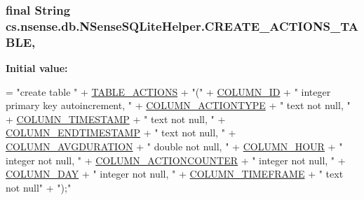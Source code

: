 \hypertarget{classcs_1_1nsense_1_1db_1_1_n_sense_s_q_lite_helper_aedf992886bbf3b5842f6417426c7d37e}{
\subsubsection[{C\-R\-E\-A\-T\-E\-\_\-\-A\-C\-T\-I\-O\-N\-S\-\_\-\-T\-A\-B\-L\-E}]{\setlength{\rightskip}{0pt plus 5cm}final String cs.\-nsense.\-db.\-N\-Sense\-S\-Q\-Lite\-Helper.\-C\-R\-E\-A\-T\-E\-\_\-\-A\-C\-T\-I\-O\-N\-S\-\_\-\-T\-A\-B\-L\-E\hspace{0.3cm}{\ttfamily [static]}, {\ttfamily [private]}}}\label{classcs_1_1nsense_1_1db_1_1_n_sense_s_q_lite_helper_aedf992886bbf3b5842f6417426c7d37e}
{\bfseries Initial value\-:}
\begin{DoxyCode}
= \textcolor{stringliteral}{"create table "}
            + \hyperlink{classcs_1_1nsense_1_1db_1_1_n_sense_s_q_lite_helper_a5f659e28731b09d4ca291943321aa63d}{TABLE\_ACTIONS} + \textcolor{stringliteral}{"("}
            + \hyperlink{classcs_1_1nsense_1_1db_1_1_n_sense_s_q_lite_helper_a42c92e67b4392524cb4f6bf4c4da4c79}{COLUMN\_ID} + \textcolor{stringliteral}{" integer primary key autoincrement, "}
            + \hyperlink{classcs_1_1nsense_1_1db_1_1_n_sense_s_q_lite_helper_a4c4a857f8054a2172b2a7f2857787c20}{COLUMN\_ACTIONTYPE} + \textcolor{stringliteral}{" text not null, "}
            + \hyperlink{classcs_1_1nsense_1_1db_1_1_n_sense_s_q_lite_helper_a37a51662ad91359cdc1218f20e1de3b1}{COLUMN\_TIMESTAMP} + \textcolor{stringliteral}{" text not null, "}
            + \hyperlink{classcs_1_1nsense_1_1db_1_1_n_sense_s_q_lite_helper_a68730f905d374511aa5caf74f9ee728e}{COLUMN\_ENDTIMESTAMP} + \textcolor{stringliteral}{" text not null, "}
            + \hyperlink{classcs_1_1nsense_1_1db_1_1_n_sense_s_q_lite_helper_a00ad71140d9af9a9f820992793244221}{COLUMN\_AVGDURATION} + \textcolor{stringliteral}{" double not null, "}
            + \hyperlink{classcs_1_1nsense_1_1db_1_1_n_sense_s_q_lite_helper_a9e10735627e7603a3fba1e9fa908efa6}{COLUMN\_HOUR} + \textcolor{stringliteral}{" integer not null, "}
            + \hyperlink{classcs_1_1nsense_1_1db_1_1_n_sense_s_q_lite_helper_a0a8906d703a22bdcad7fe68cff136c2c}{COLUMN\_ACTIONCOUNTER} + \textcolor{stringliteral}{" integer not null, "}
            + \hyperlink{classcs_1_1nsense_1_1db_1_1_n_sense_s_q_lite_helper_af9a46b1c32ed79596c97f182ab2fe4dd}{COLUMN\_DAY} + \textcolor{stringliteral}{" integer not null, "}
            + \hyperlink{classcs_1_1nsense_1_1db_1_1_n_sense_s_q_lite_helper_a54046eeaa614b1a4dd715f2d9891401e}{COLUMN\_TIMEFRAME} + \textcolor{stringliteral}{" text not null"}
            + \textcolor{stringliteral}{");"}
\end{DoxyCode}
